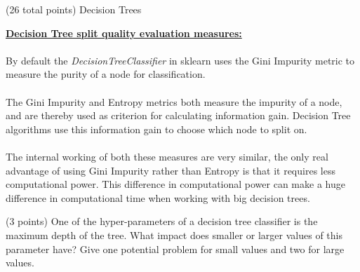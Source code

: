 \documentclass[12pt]{article}
\begin{document}
\begin{question}{(26 total points) Decision Trees}
\begin{subquestion}
\begin{answerbox}{18em}
\large{\textbf{\underline{Decision Tree split quality evaluation measures:}}}\\
\normalsize{
\\
By default the \emph{DecisionTreeClassifier} in sklearn uses the Gini Impurity metric to measure the purity of a node for classification.\\
\\
The Gini Impurity and Entropy metrics both measure the impurity of a node, and are thereby used as criterion for calculating information gain. Decision Tree algorithms use this information gain to choose which node to split on.\\
\\
The internal working of both these measures are very similar, the only real advantage of using Gini Impurity rather than Entropy is that it requires less computational power. This difference in computational power can make a huge difference in computational time when working with big decision trees.
}
\end{answerbox}



\end{subquestion}


%
%
\begin{subquestion}{(3 points) 
One of the hyper-parameters of a decision tree classifier is the maximum depth of the tree. 
What impact does smaller or larger values of this parameter have? Give one potential problem for small values and two for large values. 
}



\end{subquestion}
\end{question}
\end{document}
